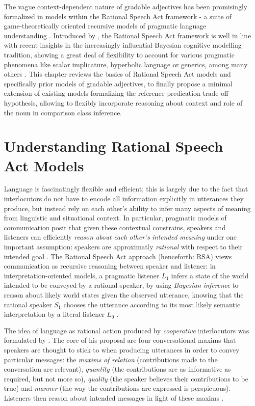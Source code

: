 The vague context-dependent nature of gradable adjectives has been promisingly formalized in models within the Rational Speech Act framework -  a suite of game-theoretically oriented recursive models of pragmatic language understanding \parencite[e.g.,][]{goodman2016, lassiter2017adjectival, tessler2017warm}. Introduced by \textcite{frank2012predicting}, the Rational Speech Act framework is well in line with recent insights in the increasingly influential Bayesian cognitive modelling tradition, showing a great deal of flexibility to account for various pragmatic phenomena like scalar implicature, hyperbolic language or generics, among many others \parencite[e.g.,][]{tenenbaum2011grow, problang}. This chapter reviews the basics of Rational Speech Act models and specifically prior models of gradable adjectives, to finally propose a minimal extension of existing models formalizing the reference-predication trade-off hypothesis, allowing to flexibly incorporate reasoning about context and role of the noun in comparison class inference. 
  
\section{Understanding Rational Speech Act Models}

Language is fascinatingly flexible and efficient; this is largely due to the fact that interlocutors do not have to encode all information explicitly in utterances they produce, but instead rely on each other's ability to infer many aspects of meaning from linguistic and situational context. In particular, pragmatic models of communication posit that given these contextual constrains, speakers and listeners can efficiently \emph{reason about each other's intended meaning} under one important assumption: speakers are approximatly \emph{rational} with respect to their intended goal \parencite{frank2012predicting}. The Rational Speech Act approach (henceforth: RSA) views communication as recursive reasoning between speaker and listener: in interpretation-oriented models, a pragmatic listener $L_1$ infers a state of the world intended to be conveyed by a rational speaker, by using \emph{Bayesian inference} to reason about likely world states given the observed utterance, knowing that the rational speaker $S_1$ chooses the utterance according to its most likely semantic interpretation by a literal listener $L_0$ \parencite{problang}.  

The idea of language as rational action produced by \emph{cooperative} interlocutors was formulated by \textcite{grice1975logic}. The core of his proposal are four conversational maxims that speakers are thought to stick to when producing utterances in order to convey particular messages: the \emph{maxims of relation} (contributions made to the conversation are relevant), \emph{quantity} (the contributions are as informative as required, but not more so), \emph{quality} (the speaker believes their contributions to be true) and \emph{manner} (the way the contributions are expressed is perspicuous). Listeners then reason about intended messages in light of these maxims \parencite{grice1975logic}.

